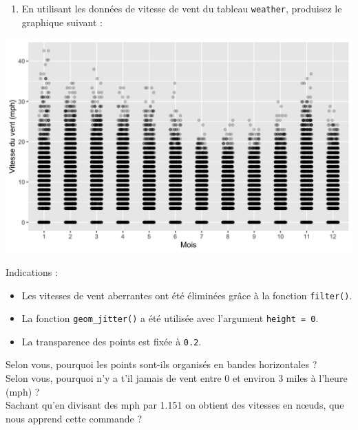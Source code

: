 \documentclass[
  a4paper,
]{article}
\newenvironment{Shaded}{\begin{snugshade}}{\end{snugshade}}
\newcommand{\FloatTok}[1]{\textcolor[rgb]{0.69,0.50,0.00}{#1}}
\newcommand{\KeywordTok}[1]{\textcolor[rgb]{0.12,0.11,0.11}{\textbf{#1}}}
\newcommand{\NormalTok}[1]{\textcolor[rgb]{0.12,0.11,0.11}{#1}}
\newcommand{\OperatorTok}[1]{\textcolor[rgb]{0.12,0.11,0.11}{#1}}
\providecommand{\tightlist}{%
  \setlength{\itemsep}{0pt}\setlength{\parskip}{0pt}}
\begin{document}
\begin{enumerate}
\def\labelenumi{\arabic{enumi}.}
\setcounter{enumi}{3}
\tightlist
\item
  En utilisant les données de vitesse de vent du tableau \texttt{weather}, produisez le graphique suivant :
\end{enumerate}

\begin{center}\includegraphics[width=0.9\linewidth]{figure/windspeed-1} \end{center}

Indications :

\begin{itemize}
\tightlist
\item
  Les vitesses de vent aberrantes ont été éliminées grâce à la fonction \texttt{filter()}.
\item
  La fonction \texttt{geom\_jitter()} a été utilisée avec l'argument \texttt{height\ =\ 0}.
\item
  La transparence des points est fixée à \texttt{0.2}.
\end{itemize}

Selon vous, pourquoi les points sont-ils organisés en bandes horizontales ?\\
Selon vous, pourquoi n'y a t'il jamais de vent entre 0 et environ 3 miles à l'heure (mph) ?\\
Sachant qu'en divisant des mph par 1.151 on obtient des vitesses en nœuds, que nous apprend cette commande ?

\begin{Shaded}
\end{Shaded}
\end{document}
